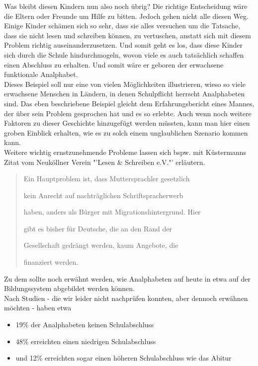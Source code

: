 Was bleibt diesen Kindern nun also noch übrig? Die richtige Entscheidung wäre die Eltern oder Freunde um Hilfe zu bitten. Jedoch gehen nicht alle diesen Weg. Einige Kinder schämen sich so sehr, dass sie alles versuchen um die Tatsache, dass sie nicht lesen und schreiben können, zu vertuschen, anstatt sich mit diesem Problem richtig auseinanderzusetzen. Und somit geht es los, dass diese Kinder sich durch die Schule hindurchmogeln, wovon viele es auch tatsächlich schaffen einen Abschluss zu erhalten. Und somit wäre er geboren der erwachsene funktionale Analphabet. \\


Dieses Beispiel soll nur eine von vielen Möglichkeiten illustrieren, wieso so viele erwachsene Menschen in Ländern, in denen Schulpflicht herrscht Analphabeten sind. Das eben beschriebene Beispiel gleicht dem Erfahrungsbericht eines Mannes, der über sein Problem gesprochen hat und es so erlebte. Auch wenn noch weitere Faktoren zu dieser Geschichte hinzugefügt werden müssten, kann man hier einen groben Einblick erhalten, wie es zu solch einem unglaublichen Szenario kommen kann.\\


Weitere wichtig ernstzunehmende Probleme lassen sich bspw. mit Küstermanns Zitat vom Neuköllner Verein "'Lesen \& Schreiben e.V."' erläutern.


\begin{quote}

	Ein Hauptproblem ist, dass Muttersprachler gesetzlich

	kein Anrecht auf nachträglichen Schriftspracherwerb

	haben, anders als Bürger mit Migrationshintergrund. Hier

	gibt es bisher für Deutsche, die an den Rand der

	Gesellschaft gedrängt werden, kaum Angebote, die

	finanziert werden.

\end{quote}


Zu dem sollte noch erwähnt werden, wie Analphabeten auf heute in etwa auf der Bildungssystem abgebildet werden können.\\

Nach Studien - die wir leider nicht nachprüfen konnten, aber dennoch erwähnen möchten - haben etwa 


\begin{itemize}

	\item 19\% der Analphabeten keinen Schulabschluss

	\item 48\% erreichten einen niedrigen Schulabschluss

	\item und 12\% erreichten sogar einen höheren Schulabschluss wie das Abitur

\end{itemize}


